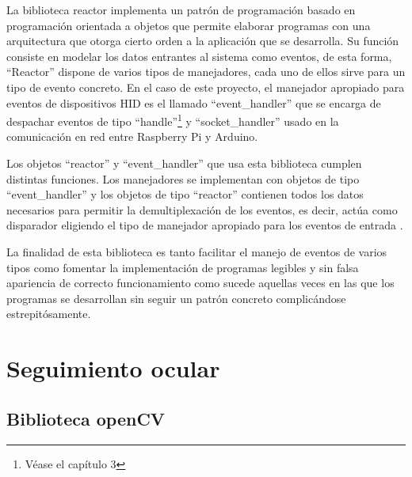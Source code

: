 La biblioteca reactor implementa un patrón de programación basado en programación orientada a objetos que permite elaborar programas con una arquitectura que otorga cierto orden a la aplicación que se desarrolla. Su función consiste en modelar los datos entrantes al sistema como eventos, de esta forma, ``Reactor'' dispone de varios tipos de manejadores, cada uno de ellos sirve para un tipo de evento concreto. En el caso de este proyecto, el manejador apropiado para eventos de dispositivos HID es el llamado ``event\_handler'' que se encarga de despachar eventos de tipo ``handle''\footnote{Véase el capítulo 3} y ``socket\_handler'' usado en la comunicación en red entre Raspberry Pi y Arduino. 

Los objetos ``reactor'' y ``event\_handler'' que usa esta biblioteca cumplen distintas funciones. Los manejadores se implementan con objetos de tipo ``event\_handler'' y los objetos de tipo ``reactor'' contienen todos los datos necesarios para permitir la demultiplexación de los eventos, es decir, actúa como disparador eligiendo el tipo de manejador apropiado para los eventos de entrada \citep{franciscoreactor}.

La finalidad de esta biblioteca es tanto facilitar el manejo de eventos de varios tipos como fomentar la implementación de programas legibles y sin falsa apariencia de correcto funcionamiento como sucede aquellas veces en las que los programas se desarrollan sin seguir un patrón concreto complicándose estrepitósamente.













\newpage
\section{Seguimiento ocular} \label{s2_2}

\subsection{Biblioteca openCV} \label{s2_2_1}

